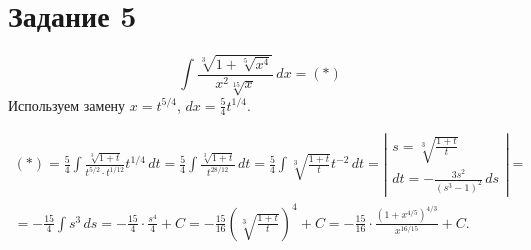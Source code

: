 \section{Задание 5}
\[ \int \frac{\sqrt[3]{1+\sqrt[5]{x^4}}}{x^2 \sqrt[15]{x}} \, dx  = (*) \]
Используем замену $ x = t^{5/4} $, $ dx = \frac{5}{4} t^{1/4} $.

\begin{multline*}
    (*) = \frac{5}{4} \int \frac{\sqrt[3]{1+t}}{t^{5/2} \cdot t^{1/12}} t^{1/4}
    \, dt = \frac{5}{4}\int \frac{\sqrt[3]{1+t}}{t^{28/12}} \, dt = 
    \frac{5}{4}\int \sqrt[3]{\frac{1+t}{t}} t^{-2} \, dt = 
    \left|\begin{array}{l}
        s = \sqrt[3]{\frac{1+t}{t}} \\
        dt = -\frac{3s^2}{(s^3-1)^2} \, ds
    \end{array}\right| = \\
    = -\frac{15}{4}\int s^3 \, ds = -\frac{15}{4} \cdot \frac{s^4}{4} + C = 
    -\frac{15}{16} \left(\sqrt[3]{\frac{1+t}{t}}\right)^4 + C = 
    -\frac{15}{16} \cdot \frac{(1+x^{4/5})^{4/3}}{x^{16/15}} + C.
\end{multline*}
